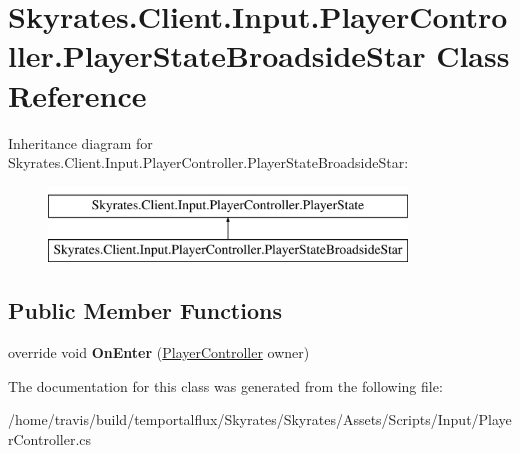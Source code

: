 \hypertarget{class_skyrates_1_1_client_1_1_input_1_1_player_controller_1_1_player_state_broadside_star}{\section{Skyrates.\-Client.\-Input.\-Player\-Controller.\-Player\-State\-Broadside\-Star Class Reference}
\label{class_skyrates_1_1_client_1_1_input_1_1_player_controller_1_1_player_state_broadside_star}
}
Inheritance diagram for Skyrates.\-Client.\-Input.\-Player\-Controller.\-Player\-State\-Broadside\-Star\-:\begin{figure}[H]
\begin{center}
\leavevmode
\includegraphics[height=2.000000cm]{class_skyrates_1_1_client_1_1_input_1_1_player_controller_1_1_player_state_broadside_star}
\end{center}
\end{figure}
\subsection*{Public Member Functions}
\begin{DoxyCompactItemize}
\item 
\hypertarget{class_skyrates_1_1_client_1_1_input_1_1_player_controller_1_1_player_state_broadside_star_ab703370ca005bbdcd018ce08e3c76463}{override void {\bfseries On\-Enter} (\hyperlink{class_skyrates_1_1_client_1_1_input_1_1_player_controller}{Player\-Controller} owner)}\label{class_skyrates_1_1_client_1_1_input_1_1_player_controller_1_1_player_state_broadside_star_ab703370ca005bbdcd018ce08e3c76463}

\end{DoxyCompactItemize}


The documentation for this class was generated from the following file\-:\begin{DoxyCompactItemize}
\item 
/home/travis/build/temportalflux/\-Skyrates/\-Skyrates/\-Assets/\-Scripts/\-Input/Player\-Controller.\-cs\end{DoxyCompactItemize}
